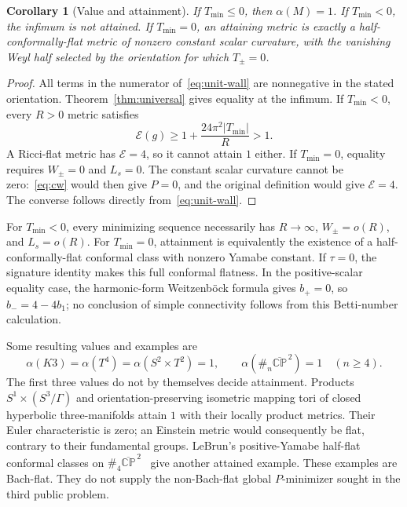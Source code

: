 \documentclass[11pt]{article}
\newcommand{\CP}{\mathbb{CP}}
\newcommand{\cE}{\mathcal E}
\newtheorem{corollary}[theorem]{Corollary}
\theoremstyle{definition}
\theoremstyle{remark}
\begin{document}
\begin{corollary}[Value and attainment]
\label{cor:unit-wall}
If $T_{\min}\le0$, then $\alpha(M)=1$.
If $T_{\min}<0$, the infimum is not attained.
If $T_{\min}=0$, an attaining metric is exactly a half-conformally-flat
metric of nonzero constant scalar curvature, with the vanishing Weyl half
selected by the orientation for which $T_\pm=0$.
\end{corollary}
\begin{proof}
All terms in the numerator of~\eqref{eq:unit-wall} are nonnegative
in the stated orientation. Theorem~\ref{thm:universal} gives equality
at the infimum. If $T_{\min}<0$, every $R>0$ metric satisfies
\[
 \cE(g)\ge1+\frac{24\pi^2|T_{\min}|}{R}>1.
\]
A Ricci-flat metric has $\cE=4$, so it cannot attain $1$ either.
If $T_{\min}=0$, equality requires $W_\pm=0$ and $L_s=0$.
The constant scalar curvature cannot be zero:~\eqref{eq:cw} would then
give $P=0$, and the original definition would give $\cE=4$.
The converse follows directly from~\eqref{eq:unit-wall}.
\end{proof}

For $T_{\min}<0$, every minimizing sequence necessarily has
$R\to\infty$, $W_\pm=o(R)$, and $L_s=o(R)$.
For $T_{\min}=0$, attainment is equivalently the existence of a
half-conformally-flat conformal class with nonzero Yamabe constant.
If $\tau=0$, the signature identity makes this full conformal flatness.
In the positive-scalar equality case, the harmonic-form Weitzenb\"ock
formula gives $b_+=0$, so $b_-=4-4b_1$; no conclusion of simple
connectivity follows from this Betti-number calculation.

Some resulting values and examples are
\begin{equation}
 \alpha(K3)=\alpha(T^4)=\alpha(S^2\times T^2)=1,
 \qquad \alpha(\#_n\overline{\CP}^{\,2})=1\quad(n\ge4).
 \label{eq:unit-examples}
\end{equation}
The first three values do not by themselves decide attainment.
Products $S^1\times(S^3/\Gamma)$ and orientation-preserving isometric
mapping tori of closed hyperbolic three-manifolds attain $1$ with their
locally product metrics. Their Euler characteristic is zero; an Einstein
metric would consequently be flat, contrary to their fundamental groups.
LeBrun's positive-Yamabe half-flat conformal classes on
$\#_4\overline{\CP}^{\,2}$~\cite{LNN} give another attained example.
These examples are Bach-flat. They do not supply the non-Bach-flat
global $P$-minimizer sought in the third public problem.
\end{document}
